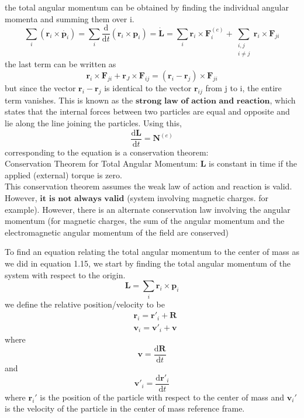 \documentclass[]{article}
\numberwithin{equation}{section}
\begin{document}
the total angular momentum can be obtained by finding the individual angular momenta and summing them over i.
$$\sum_i(\mathbf r_i\times\dot{\mathbf p_i})=\sum_i\frac{\mathrm d}{\mathrm dt}(\mathbf r_i\times\mathbf p_i)=\mathbf{\dot L}=\sum_i\mathbf r_i\times\mathbf F_i^{(e)}+\sum_{\substack{i,j\\i\ne j}}\mathbf r_i\times\mathbf F_{ji}$$
the last term can be written as
$$\mathbf r_i\times\mathbf F_{ji}+\mathbf r_J\times\mathbf F_{ij}=(\mathbf r_i-\mathbf r_j)\times\mathbf F_{ji}$$
but since the vector $\mathbf r_i-\mathbf r_j$ is identical to the vector $\mathbf r_{ij}$ from j to i, the entire term vanishes. This is known as the $\textbf{strong law of action and reaction}$, which states that the internal forces between two particles are equal and opposite and lie along the line joining the particles. Using this, 
\begin{equation}\frac{\mathrm d\mathbf L}{\mathrm dt}=\mathbf N^{(e)}\end{equation}
corresponding to the equation is a conservation theorem:\\

Conservation Theorem for Total Angular Momentum: $\mathbf L$ is constant in time if the applied (external) torque is zero.\\

This conservation theorem assumes the weak law of action and reaction is valid. However, $\textbf{it is not always valid}$ (system involving magnetic charges. for example). However, there is an alternate conservation law involving the angular momentum (for magnetic charges, the sum of the angular momentum and the electromagnetic angular momentum of the field are conserved)

To find an equation relating the total angular momentum to the center of mass as we did in equation 1.15, we start by finding the total angular momentum of the system with respect to the origin.
$$\mathbf L=\sum_i\mathbf r_i\times\mathbf p_i$$
we define the relative position/velocity to be 
\begin{align}
	&\mathbf r_i=\mathbf r'_i+\mathbf R\\
	&\mathbf v_i=\mathbf v'_i+\mathbf v
\end{align}
where 
$$\mathbf v=\frac{\mathrm d\mathbf R}{\mathrm dt}$$
and 
$$\mathbf v'_i=\frac{\mathrm d\mathbf r'_i}{\mathrm dt}$$
where $\mathbf r_i'$ is the position of the particle with respect to the center of mass and $\mathbf v_i'$ is the velocity of the particle in the center of mass reference frame.
\end{document}
